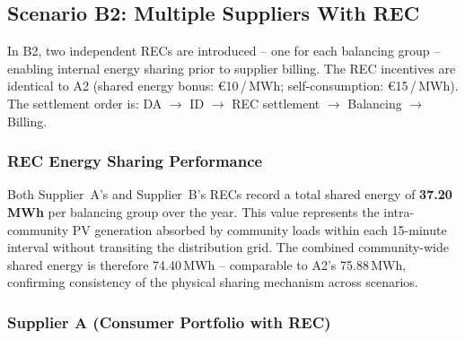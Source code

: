 \subsection{Scenario B2: Multiple Suppliers With REC}
\label{sec:results_B2}

In B2, two independent RECs are introduced -- one for each balancing group --
enabling internal energy sharing prior to supplier billing.  The REC incentives
are identical to A2 (shared energy bonus: €10\,/\,MWh; self-consumption:
€15\,/\,MWh).  The settlement order is:
DA $\to$ ID $\to$ REC settlement $\to$ Balancing $\to$ Billing.

\subsubsection{REC Energy Sharing Performance}

Both Supplier~A's and Supplier~B's RECs record a total shared energy of
\textbf{37.20\,MWh} per balancing group over the year.  This value represents
the intra-community PV generation absorbed by community loads within each
15-minute interval without transiting the distribution grid.  The combined
community-wide shared energy is therefore 74.40\,MWh -- comparable to A2's
75.88\,MWh, confirming consistency of the physical sharing mechanism across
scenarios.

\subsubsection{Supplier A (Consumer Portfolio with REC)}

